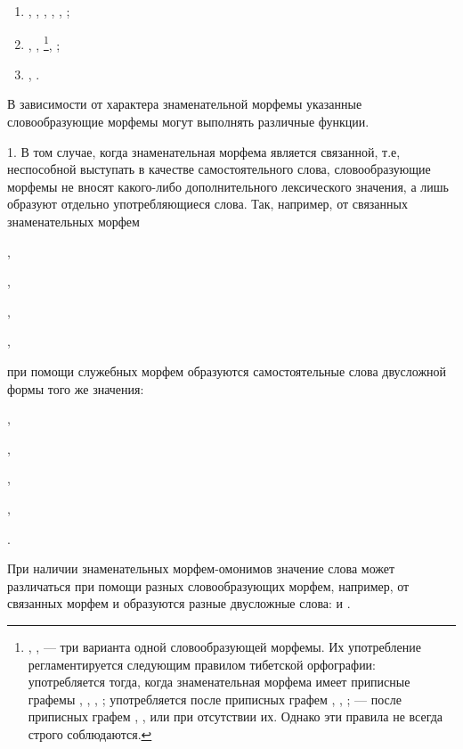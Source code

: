 \begin{enumerate}
    \item {}, , , , , ;
    \item {}, , 
    \footnote[25]{, ,  --- три варианта одной словообразующей морфемы. Их употребление регламентируется следующим правилом тибетской орфографии:  употребляется тогда, когда знаменательная морфема имеет приписные графемы , , , ;  употребляется после приписных графем , , ;  --- после приписных графем , ,  или при отсутствии их. Однако эти правила не всегда строго соблюдаются.},
    ;
    \item {}, .
\end{enumerate}

В зависимости от характера знаменательной морфемы указанные словообразующие морфемы могут выполнять различные функции.

1. В том случае, когда знаменательная морфема является связанной, т.е, неспособной выступать в качестве самостоятельного слова, словообразующие морфемы не
вносят какого-либо дополнительного лексического значения, а лишь образуют отдельно употребляющиеся слова. Так, например, от связанных знаменательных морфем
\begin{prfsample}
    \item {},
    \item {},
    \item {},
    \item {},
    \item {} 
\end{prfsample}
при помощи служебных морфем образуются самостоятельные слова двусложной формы того же значения:
\begin{prfsample}
    \item {},
    \item {},
    \item {},
    \item {},
    \item {}.
\end{prfsample}
При наличии знаменательных морфем-омонимов значение слова может различаться при помощи разных словообразующих морфем, например, от связанных морфем  и  образуются разные двусложные слова:  и .

